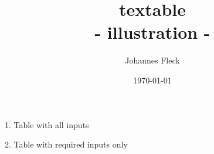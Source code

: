 \documentclass[11pt]{amsart}
\title{textable \\ - illustration -}
\author{Johannes Fleck}
\date{\today}
\begin{document}
\maketitle


\bigskip

1. Table with all inputs


2. Table with required inputs only

\end{document}
